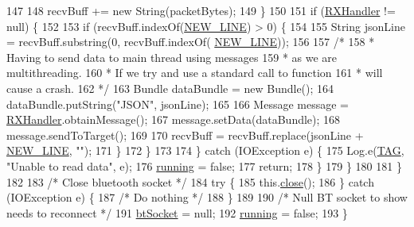 \begin{DoxyCode}
147 
148                         recvBuff += \textcolor{keyword}{new} String(packetBytes);
149                     \}
150 
151                     \textcolor{keywordflow}{if} (\hyperlink{classcom_1_1jack_1_1motorbikestatistics_1_1_b_t_connection_a64fc7b02a2b9f052c6b05842b79b3cdc}{RXHandler} != null) \{
152 
153                         \textcolor{keywordflow}{if} (recvBuff.indexOf(\hyperlink{classcom_1_1jack_1_1motorbikestatistics_1_1_b_t_connection_aacec2fadb24352fd7fdeae731e3ed412}{NEW\_LINE}) > 0) \{
154 
155                             String jsonLine = recvBuff.substring(0, recvBuff.indexOf(
      \hyperlink{classcom_1_1jack_1_1motorbikestatistics_1_1_b_t_connection_aacec2fadb24352fd7fdeae731e3ed412}{NEW\_LINE}));
156 
157                             \textcolor{comment}{/*}
158 \textcolor{comment}{                             * Having to send data to main thread using messages}
159 \textcolor{comment}{                             * as we are multithreading.}
160 \textcolor{comment}{                             * If we try and use a standard call to function}
161 \textcolor{comment}{                             * will cause a crash.}
162 \textcolor{comment}{                             */}
163                             Bundle dataBundle =  \textcolor{keyword}{new} Bundle();
164                             dataBundle.putString(\textcolor{stringliteral}{"JSON"}, jsonLine);
165 
166                             Message message = \hyperlink{classcom_1_1jack_1_1motorbikestatistics_1_1_b_t_connection_a64fc7b02a2b9f052c6b05842b79b3cdc}{RXHandler}.obtainMessage();
167                             message.setData(dataBundle);
168                             message.sendToTarget();
169 
170                             recvBuff = recvBuff.replace(jsonLine + \hyperlink{classcom_1_1jack_1_1motorbikestatistics_1_1_b_t_connection_aacec2fadb24352fd7fdeae731e3ed412}{NEW\_LINE}, \textcolor{stringliteral}{""});
171                         \}
172                     \}
173 
174                 \} \textcolor{keywordflow}{catch} (IOException e) \{
175                     Log.e(\hyperlink{classcom_1_1jack_1_1motorbikestatistics_1_1_b_t_connection_af9455991fec4de29ffc875eae117a761}{TAG}, \textcolor{stringliteral}{"Unable to read data"}, e);
176                     \hyperlink{classcom_1_1jack_1_1motorbikestatistics_1_1_b_t_connection_a6193b7b92b7f2905a3a43d63db40aba8}{running} = \textcolor{keyword}{false};
177                     \textcolor{keywordflow}{return};
178                 \}
179             \}
180 
181         \}
182 
183         \textcolor{comment}{/* Close bluetooth socket */}
184         \textcolor{keywordflow}{try} \{
185             this.\hyperlink{classcom_1_1jack_1_1motorbikestatistics_1_1_b_t_connection_ac1cd0e85a758db424a57010ac9bb87f0}{close}();
186         \} \textcolor{keywordflow}{catch} (IOException e) \{
187             \textcolor{comment}{/* Do nothing */}
188         \}
189 
190         \textcolor{comment}{/* Null BT socket to show needs to reconnect */}
191         \hyperlink{classcom_1_1jack_1_1motorbikestatistics_1_1_b_t_connection_a0d47f94a35f7c8a07429975446e7b33b}{btSocket} = null;
192         \hyperlink{classcom_1_1jack_1_1motorbikestatistics_1_1_b_t_connection_a6193b7b92b7f2905a3a43d63db40aba8}{running} = \textcolor{keyword}{false};
193     \}
\end{DoxyCode}
